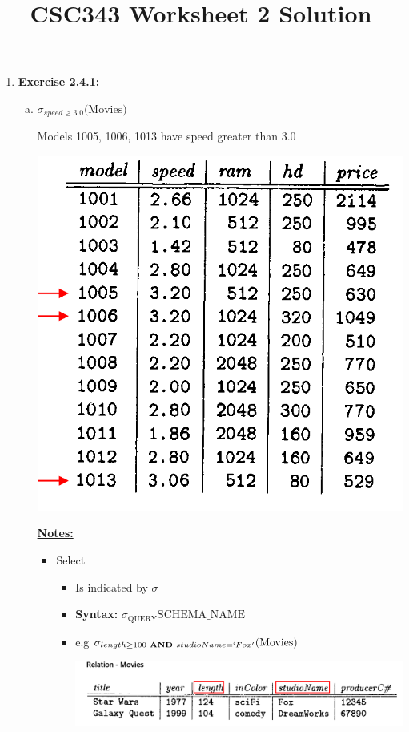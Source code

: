 \documentclass[12pt]{article}
\begin{document}
\title{CSC343 Worksheet 2 Solution}
\maketitle

\bigskip

\begin{enumerate}
    \item \textbf{Exercise 2.4.1:}

    \begin{enumerate}[a)]
        \item

        $\sigma_{speed \geq 3.0}\text{(Movies)}$

        \bigskip

        Models 1005, 1006, 1013 have speed greater than 3.0

        \bigskip

        \begin{center}
        \includegraphics[width=0.4\linewidth]{images/worksheet_2_solution_2.png}
        \end{center}

        \bigskip

        \underline{\textbf{Notes:}}

        \bigskip

        \begin{itemize}
            \item Select
            \begin{itemize}
                \item Is indicated by $\sigma$
                \item \textbf{Syntax:} $\sigma_{\text{QUERY}} \text{SCHEMA\_NAME}$
                \item e.g $\sigma_{length \geq 100 \textbf{ AND } studioName=`Fox'} \text{(Movies)}$

                \bigskip

                \begin{center}
                \includegraphics[width=\linewidth]{images/worksheet_2_solution_1.png}
                \end{center}
            \end{itemize}
        \end{itemize}


\end{enumerate}
\end{enumerate}
\end{document}
